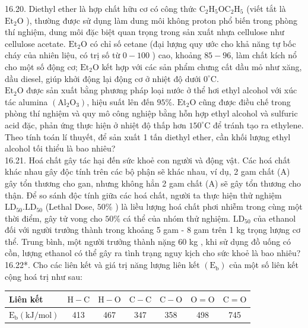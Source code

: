 \documentclass[10pt]{article}
\begin{document}
16.20. Diethyl ether là hợp chất hữu cơ có công thức $\mathrm{C}_{2} \mathrm{H}_{5} \mathrm{OC}_{2} \mathrm{H}_{5}$ (viết tắt là $\mathrm{Et}_{2} \mathrm{O}$ ), thường được sử dụng làm dung môi không proton phổ biến trong phòng thí nghiệm, dung môi đặc biệt quan trọng trong sản xuất nhựa cellulose như cellulose acetate. $\mathrm{Et}_{2} \mathrm{O}$ có chỉ số cetane (đại lượng quy ước cho khả năng tự bốc cháy của nhiên liệu, có trị số từ $0-100$ ) cao, khoảng $85-96$, làm chất kích nổ cho một số động cơ; $\mathrm{Et}_{2} \mathrm{O}$ kết hợp với các sản phẩm chưng cất dầu mỏ như xăng, dầu diesel, giúp khởi động lại động cơ ở nhiệt độ dưới $0^{\circ} \mathrm{C}$.\\
$\mathrm{Et}_{2} \mathrm{O}$ được sản xuất bằng phương pháp loại nước ở thể hơi ethyl alcohol với xúc tác alumina $\left(\mathrm{Al}_{2} \mathrm{O}_{3}\right)$, hiệu suất lên đến $95 \%$. $\mathrm{Et}_{2} \mathrm{O}$ cũng được điều chế trong phòng thí nghiệm và quy mô công nghiệp bằng hỗn hợp ethyl alcohol và sulfuric acid đặc, phản ứng thực hiện ở nhiệt độ thấp hơn $150^{\circ} \mathrm{C}$ để tránh tạo ra ethylene.\\
Theo tính toán lí thuyết, để sản xuất 1 tấn diethyl ether, cần khối lượng ethyl alcohol tối thiểu là bao nhiêu?\\
16.21. Hoá chất gây tác hại đến sức khoẻ con người và động vật. Các hoá chất khác nhau gây độc tính trên các bộ phận sẽ khác nhau, ví dụ, 2 gam chất (A) gây tổn thương cho gan, nhưng không hẳn 2 gam chất (A) sẽ gây tổn thương cho thận. Để so sánh độc tính giữa các hoá chất, người ta thực hiện thử nghiệm $\mathrm{LD}_{50} . \mathrm{LD}_{50}$ (Lethal Dose, $50 \%$ ) là liều lượng hoá chất phơi nhiễm trong cùng một thời điểm, gây tử vong cho $50 \%$ cá thể của nhóm thử nghiệm. $\mathrm{LD}_{50}$ của ethanol đối với người trưởng thành trong khoảng 5 gam - 8 gam trên 1 kg trọng lượng cơ thể. Trung bình, một người trưởng thành nặng 60 kg , khi sử dụng đồ uống có cồn, lượng ethanol có thể gây ra tình trạng nguy kịch cho sức khoẻ là bao nhiêu?\\
16.22*. Cho các liên kết và giá trị năng lượng liên kết $\left(\mathrm{E}_{\mathrm{b}}\right)$ của một số liên kết cộng hoá trị như sau:

\begin{center}
\begin{tabular}{|l|c|c|c|c|c|c|}
\hline
Liên kết & $\mathrm{H}-\mathrm{C}$ & $\mathrm{H}-\mathrm{O}$ & $\mathrm{C}-\mathrm{C}$ & $\mathrm{C}-\mathrm{O}$ & $\mathrm{O}=\mathrm{O}$ & $\mathrm{C}=\mathrm{O}$ \\
\hline
$\mathrm{E}_{\mathrm{b}}(\mathrm{kJ} / \mathrm{mol})$ & 413 & 467 & 347 & 358 & 498 & 745 \\
\hline
\end{tabular}
\end{center}
\end{document}

